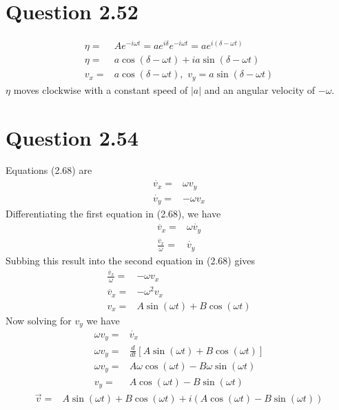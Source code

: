 \documentclass[12pt, a4paper]{article}
\begin{document}
\pagebreak
\section*{Question 2.52}
\begin{align*}
\eta =& A e^{-i\omega t} 
= ae^{i\delta}e^{-i\omega t}
= ae^{i(\delta-\omega t)}
\\
\eta =& a\cos(\delta-\omega t)+ia\sin(\delta-\omega t)
\\
v_x =& a\cos(\delta-\omega t), \,\, v_y = a\sin(\delta-\omega t)
\end{align*}
$\eta$ moves clockwise with a constant speed of $|a|$ and an angular velocity of $-\omega$. 








\section*{Question 2.54}
Equations (2.68) are
\begin{align*}
\dot{v_x} =& \omega v_y
\\
\dot{v_y} =& -\omega v_x
\end{align*}
Differentiating the first equation in (2.68), we have
\begin{align*}
\ddot{v_x} =& \omega \dot{v_y}
\\
\frac{\ddot{v_x}}{\omega} =&  \dot{v_y}
\end{align*}
Subbing this result into the second equation in (2.68) gives
\begin{align*}
\frac{\ddot{v_x}}{\omega} =& -\omega v_x
\\
\ddot{v_x} =& -\omega^2 v_x
\\
v_x =& \boxed{A\sin(\omega t) + B\cos(\omega t)}
\end{align*}
Now solving for $v_y$ we have
\begin{align*}
\omega v_y =& \dot{v_x} 
\\
\omega v_y =& \frac{d}{dt}[A\sin(\omega t) + B\cos(\omega t)]
\\
\omega v_y =& A\omega\cos(\omega t) - B\omega\sin(\omega t)
\\
v_y =& \boxed{A\cos(\omega t) - B\sin(\omega t)}
\end{align*}
\begin{align*}
\vec{v} =& A\sin(\omega t) + B\cos(\omega t) + i(A\cos(\omega t) - B\sin(\omega t))
\end{align*}
\end{document}
